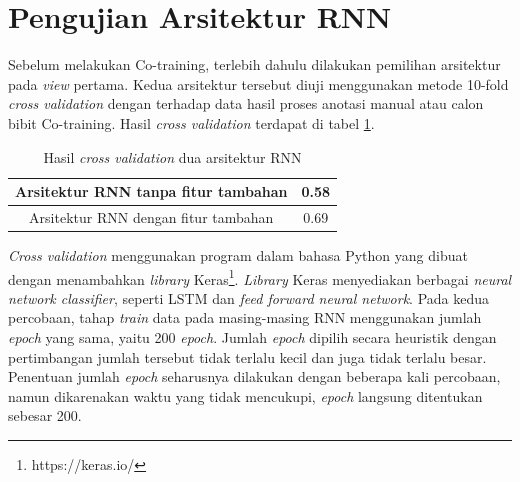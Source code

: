 \section{Pengujian Arsitektur RNN} \label{sec:uji-rnn}
Sebelum melakukan Co-training, terlebih dahulu dilakukan pemilihan arsitektur pada \textit{view} pertama. Kedua arsitektur tersebut diuji menggunakan metode 10-fold \textit{cross validation}  dengan terhadap data hasil proses anotasi manual atau calon bibit Co-training. Hasil \textit{cross validation} terdapat di tabel \ref{table:arsitekturRNN}. 
\begin{table}
	\centering
	\caption{Hasil \textit{cross validation} dua arsitektur RNN}
	\label{table:arsitekturRNN}
	\begin{tabular}{|c|c|}
		\hline
		Arsitektur RNN tanpa fitur tambahan & 0.58 \\ \hline
		Arsitektur RNN dengan fitur tambahan & 0.69 \\ \hline
	\end{tabular}
\end{table}
\textit{Cross validation} menggunakan program dalam bahasa Python yang dibuat dengan menambahkan \textit{library} Keras\footnote{https://keras.io/}. \textit{Library} Keras menyediakan berbagai \textit{neural network classifier}, seperti LSTM dan \textit{feed forward neural network}. Pada kedua percobaan, tahap \textit{train} data pada masing-masing RNN menggunakan jumlah \textit{epoch} yang sama, yaitu 200 \textit{epoch}. Jumlah \textit{epoch} dipilih secara heuristik dengan pertimbangan jumlah tersebut tidak terlalu kecil dan juga tidak terlalu besar. Penentuan jumlah \textit{epoch} seharusnya dilakukan dengan beberapa kali percobaan, namun dikarenakan waktu yang tidak mencukupi, \textit{epoch} langsung ditentukan sebesar 200.


